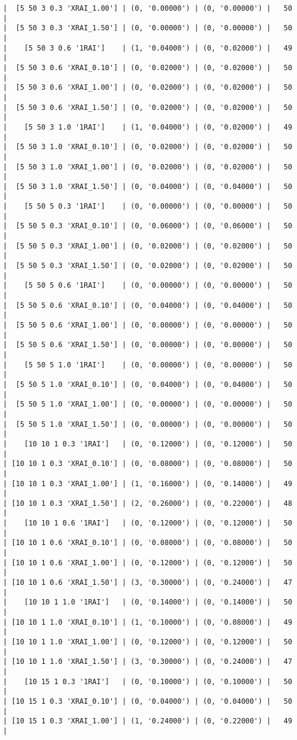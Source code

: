 \documentclass{article}
\begin{document}
\begin{verbatim}
|  [5 50 3 0.3 'XRAI_1.00'] | (0, '0.00000') | (0, '0.00000') |   50  |
|  [5 50 3 0.3 'XRAI_1.50'] | (0, '0.00000') | (0, '0.00000') |   50  |
|    [5 50 3 0.6 '1RAI']    | (1, '0.04000') | (0, '0.02000') |   49  |
|  [5 50 3 0.6 'XRAI_0.10'] | (0, '0.02000') | (0, '0.02000') |   50  |
|  [5 50 3 0.6 'XRAI_1.00'] | (0, '0.02000') | (0, '0.02000') |   50  |
|  [5 50 3 0.6 'XRAI_1.50'] | (0, '0.02000') | (0, '0.02000') |   50  |
|    [5 50 3 1.0 '1RAI']    | (1, '0.04000') | (0, '0.02000') |   49  |
|  [5 50 3 1.0 'XRAI_0.10'] | (0, '0.02000') | (0, '0.02000') |   50  |
|  [5 50 3 1.0 'XRAI_1.00'] | (0, '0.02000') | (0, '0.02000') |   50  |
|  [5 50 3 1.0 'XRAI_1.50'] | (0, '0.04000') | (0, '0.04000') |   50  |
|    [5 50 5 0.3 '1RAI']    | (0, '0.00000') | (0, '0.00000') |   50  |
|  [5 50 5 0.3 'XRAI_0.10'] | (0, '0.06000') | (0, '0.06000') |   50  |
|  [5 50 5 0.3 'XRAI_1.00'] | (0, '0.02000') | (0, '0.02000') |   50  |
|  [5 50 5 0.3 'XRAI_1.50'] | (0, '0.02000') | (0, '0.02000') |   50  |
|    [5 50 5 0.6 '1RAI']    | (0, '0.00000') | (0, '0.00000') |   50  |
|  [5 50 5 0.6 'XRAI_0.10'] | (0, '0.04000') | (0, '0.04000') |   50  |
|  [5 50 5 0.6 'XRAI_1.00'] | (0, '0.00000') | (0, '0.00000') |   50  |
|  [5 50 5 0.6 'XRAI_1.50'] | (0, '0.00000') | (0, '0.00000') |   50  |
|    [5 50 5 1.0 '1RAI']    | (0, '0.00000') | (0, '0.00000') |   50  |
|  [5 50 5 1.0 'XRAI_0.10'] | (0, '0.04000') | (0, '0.04000') |   50  |
|  [5 50 5 1.0 'XRAI_1.00'] | (0, '0.00000') | (0, '0.00000') |   50  |
|  [5 50 5 1.0 'XRAI_1.50'] | (0, '0.00000') | (0, '0.00000') |   50  |
|    [10 10 1 0.3 '1RAI']   | (0, '0.12000') | (0, '0.12000') |   50  |
| [10 10 1 0.3 'XRAI_0.10'] | (0, '0.08000') | (0, '0.08000') |   50  |
| [10 10 1 0.3 'XRAI_1.00'] | (1, '0.16000') | (0, '0.14000') |   49  |
| [10 10 1 0.3 'XRAI_1.50'] | (2, '0.26000') | (0, '0.22000') |   48  |
|    [10 10 1 0.6 '1RAI']   | (0, '0.12000') | (0, '0.12000') |   50  |
| [10 10 1 0.6 'XRAI_0.10'] | (0, '0.08000') | (0, '0.08000') |   50  |
| [10 10 1 0.6 'XRAI_1.00'] | (0, '0.12000') | (0, '0.12000') |   50  |
| [10 10 1 0.6 'XRAI_1.50'] | (3, '0.30000') | (0, '0.24000') |   47  |
|    [10 10 1 1.0 '1RAI']   | (0, '0.14000') | (0, '0.14000') |   50  |
| [10 10 1 1.0 'XRAI_0.10'] | (1, '0.10000') | (0, '0.08000') |   49  |
| [10 10 1 1.0 'XRAI_1.00'] | (0, '0.12000') | (0, '0.12000') |   50  |
| [10 10 1 1.0 'XRAI_1.50'] | (3, '0.30000') | (0, '0.24000') |   47  |
|    [10 15 1 0.3 '1RAI']   | (0, '0.10000') | (0, '0.10000') |   50  |
| [10 15 1 0.3 'XRAI_0.10'] | (0, '0.04000') | (0, '0.04000') |   50  |
| [10 15 1 0.3 'XRAI_1.00'] | (1, '0.24000') | (0, '0.22000') |   49  |

\end{verbatim}
\end{document}
